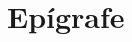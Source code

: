 \clearpage
\pagestyle{fancy}
\fancyhead{}
\fancyhead[RO,LE]{\thepage}
\fancyfoot{}
\fancyfoot[LE,RO]{}
\fancyfoot[LO,CE]{}
\fancyfoot[CO,RE]{}
\vspace*{0.7cm}
\section*{\hfill Epígrafe}
\vspace*{\fill}
\begin{flushright}
\epigrafe
\end{flushright}
